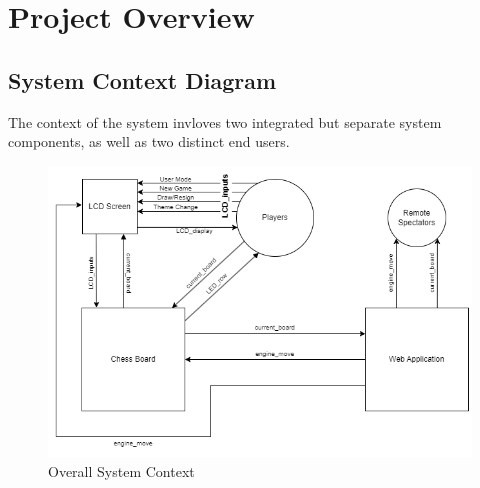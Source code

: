\documentclass[12pt]{article}
\begin{document}
\section{Project Overview}
\projectoverview

\subsection{System Context Diagram}

    The context of the system invloves two integrated but separate system components, as well as two distinct end users.

\begin{figure}[H]
  \begin{center}
    \includegraphics[scale=0.65]{chess-connect-system-context.png}
    \caption{Overall System Context}
    \label{Fig_SystemContext} 
  \end{center}
\end{figure}
\end{document}
